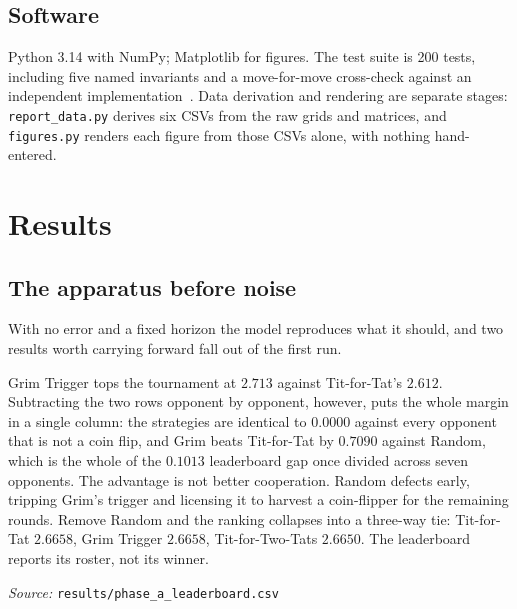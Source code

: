 \documentclass[11pt,a4paper]{article}
\newcommand{\source}[1]{\par\smallskip\footnotesize\textit{Source:} \texttt{#1}}
\begin{document}
\subsection{Software}
\label{sec:software}

Python 3.14 with NumPy; Matplotlib for figures. The test suite is 200 tests,
including five named invariants and a move-for-move cross-check against an
independent implementation~\cite{knight2016}. Data derivation and rendering are
separate stages: \texttt{report\_data.py} derives six CSVs from the raw grids
and matrices, and \texttt{figures.py} renders each figure from those CSVs alone,
with nothing hand-entered.

\section{Results}
\label{sec:results}

\subsection{The apparatus before noise}
\label{sec:apparatus}

With no error and a fixed horizon the model reproduces what it should, and two
results worth carrying forward fall out of the first run.

Grim Trigger tops the tournament at $\mathbf{2.713}$ against Tit-for-Tat's
$\mathbf{2.612}$. Subtracting the two rows opponent by opponent, however, puts
the whole margin in a single column: the strategies are identical to $0.0000$
against every opponent that is not a coin flip, and Grim beats Tit-for-Tat by
$\mathbf{0.7090}$ against Random, which is the whole of the $0.1013$
leaderboard gap once divided across seven opponents. The advantage is not better cooperation. Random
defects early, tripping Grim's trigger and licensing it to harvest a coin-flipper
for the remaining rounds. Remove Random and the ranking collapses into a
three-way tie: Tit-for-Tat $2.6658$, Grim Trigger $2.6658$, Tit-for-Two-Tats
$2.6650$. The leaderboard reports its roster, not its winner.
\source{results/phase\_a\_leaderboard.csv}
\end{document}
